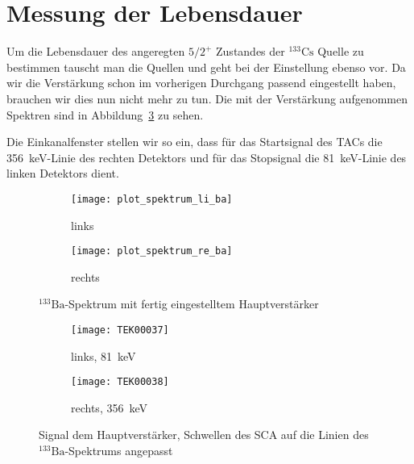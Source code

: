 \documentclass[11pt, ngerman, fleqn, DIV=15, headinclude, BCOR=2cm]{scrreprt}
\begin{document}
\clearpage
\section{Messung der Lebensdauer}
Um die Lebensdauer des angeregten $5/2^+$ Zustandes der $^{133}\text{Cs}$
Quelle zu bestimmen tauscht man die Quellen und geht bei der Einstellung ebenso
vor. Da wir die Verstärkung schon im vorherigen Durchgang passend eingestellt
haben, brauchen wir dies nun nicht mehr zu tun. Die mit der Verstärkung
aufgenommen Spektren sind in
Abbildung~\ref{fig:ba_slow_signal_hv_eingestellt_plot} zu sehen.

Die Einkanalfenster stellen wir so ein, dass für das Startsignal
des TACs die \SI{356}{\kilo\electronvolt}-Linie des rechten Detektors und für
das Stopsignal
die \SI{81}{\kilo\electronvolt}-Linie des linken Detektors dient.

\begin{figure}
	\centering
	\begin{subfigure}{0.49 \textwidth}
		\texttt{[image: plot\_spektrum\_li\_ba]}
		\caption{%
			links
		}
		\label{fig:ba_slow_hv_eingestellt-li_plot}
	\end{subfigure}
	\begin{subfigure}{0.49 \textwidth}
		\texttt{[image: plot\_spektrum\_re\_ba]}
		\caption{%
			rechts
		}
		\label{fig:ba_slow_hv_eingestellt-re_plot}
	\end{subfigure}
	\caption{%
		$^{133}\text{Ba}$-Spektrum mit fertig eingestelltem
		Hauptverstärker
	}
	\label{fig:ba_slow_signal_hv_eingestellt_plot}
\end{figure}

\begin{figure}
	\centering
	\begin{subfigure}{0.49 \textwidth}
		\texttt{[image: TEK00037]}
		\caption{%
			links, \SI{81}{\kilo\electronvolt}
		}
		\label{fig:ba_slow_signal_sca_eingestellt-li}
	\end{subfigure}
	\begin{subfigure}{0.49 \textwidth}
		\texttt{[image: TEK00038]}
		\caption{%
			rechts, \SI{356}{\kilo\electronvolt}
		}
		\label{fig:ba_slow_signal_sca_eingestellt-re}
	\end{subfigure}
	\caption{%
		Signal dem Hauptverstärker, Schwellen des SCA auf die Linien
		des $^{133}\text{Ba}$-Spektrums angepasst
	}
	\label{fig:ba_slow_signal_sca_eingestellt}
\end{figure}
\end{document}
